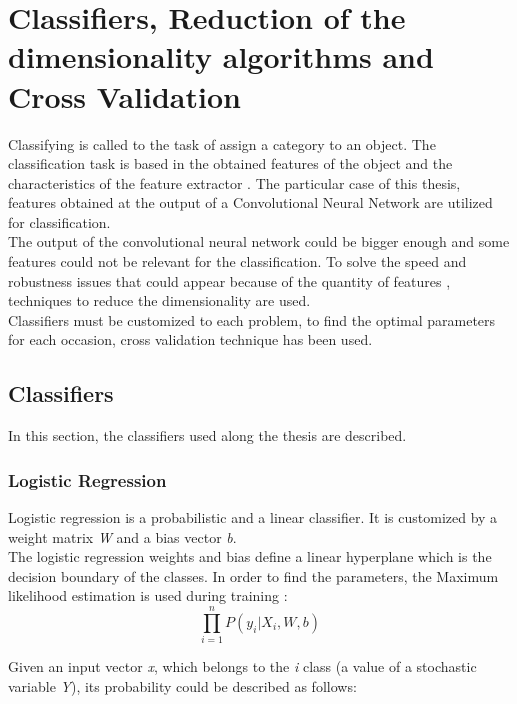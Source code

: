 \section{Classifiers, Reduction of the dimensionality algorithms and Cross Validation}
Classifying is called to the task of assign a category to an object. The classification task is based in the obtained features of the object and the characteristics of the feature extractor \cite{Duda}. The particular case of this thesis, features obtained at the output of a Convolutional Neural Network are utilized for classification.\\

The output of the convolutional neural network could be bigger enough and some features could not be relevant for the classification. To solve the speed and robustness issues that could appear because of the quantity of features \cite{PCAvsLDA}, techniques to reduce the dimensionality are used.\\

Classifiers must be customized to each problem, to find the optimal parameters for each occasion, cross validation technique has been used.\\

\subsection{Classifiers}
In this section, the classifiers used along the thesis are described.\\

\subsubsection{Logistic Regression}
Logistic regression is a probabilistic and a linear classifier. It is customized by a weight matrix \textit{W} and a bias vector \textit{b}.\\

The logistic regression weights and bias define a linear hyperplane which is the decision boundary of the classes. In order to find the parameters, the Maximum likelihood estimation is used during training \cite{ClassifiersReview}:\\

\begin{equation}
\prod_{i=1}^{n}P(y_i|X_i,W,b)
\end{equation}

Given an input vector \textit{x}, which belongs to the \textit{i} class (a value of a stochastic variable \textit{Y}), its probability could be described as follows:

